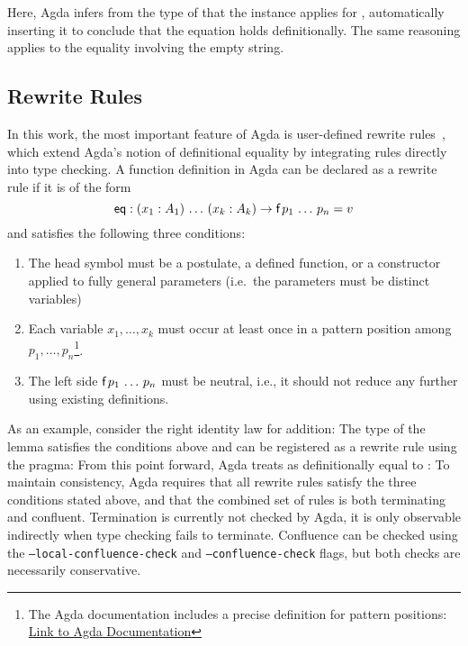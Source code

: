 \documentclass[screen,nonacm]{acmart}
\begin{document}
\noindent Here, Agda infers from the type  of  that the
instance  applies for ,
automatically inserting it to conclude that the equation holds definitionally.
The same reasoning applies to the equality involving the empty string.

\subsection*{Rewrite Rules}
In this work, the most important feature of Agda is user-defined rewrite
rules~\cite{10.1145/3434341, cockx:LIPIcs.TYPES.2019.2}, which extend Agda's
notion of definitional equality by integrating rules directly into type
checking. A function definition in Agda can be declared as a rewrite rule if it
is of the form
\[
      \AgdaFunction{eq} : (x_1 : A_1)\, \ldots\, (x_k : A_k) \to \AgdaFunction{f}\, p_1\, \ldots\, p_n = v
\]
and satisfies the following three conditions:
\begin{enumerate}
      \item The head symbol  must be a postulate, a defined function, or a
            constructor applied to fully general parameters (i.e.\ the parameters must be
            distinct variables)
      \item Each variable $x_1, \ldots, x_k$ must occur at least once in a pattern position
            among $p_1, \ldots, p_n$\footnote{The Agda documentation includes a precise
                  definition for pattern positions:
                  \href{https://agda.readthedocs.io/en/latest/language/rewriting.html}{Link to
                        Agda Documentation}}.
      \item The left side $\AgdaFunction{f}\, p_1\, \ldots\, p_n$ must be neutral, i.e., it
            should not reduce any further using existing definitions.
\end{enumerate}

\noindent As an example, consider the right identity law for addition: \ERewrite{}The
type of the lemma satisfies the conditions above and can be registered as a
rewrite rule using the  pragma: \ERewriteIt{}From this
point forward, Agda treats  \AgdaFunction{+}  as
definitionally equal to : \ERewriteEx{}To maintain consistency, Agda requires
that all rewrite rules satisfy the three conditions stated above, and that the
combined set of rules is both terminating and confluent. Termination
is currently not checked by Agda, it is only observable indirectly when type
checking fails to terminate. Confluence can be checked using the
\texttt{--local-confluence-check} and \texttt{--confluence-check} flags, but
both checks are necessarily conservative.
\end{document}
